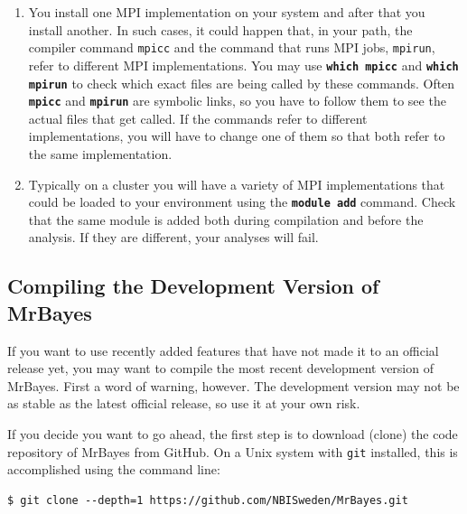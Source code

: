 \documentclass[12pt]{book}
\newcommand{\ttt}[1]{\texttt{#1}}
\newcommand{\tb}[1]{\ttt{\textbf{#1}}}
\begin{document}
\begin{enumerate}
\item You install one MPI implementation on your system and after that you install another. In
such cases, it could happen that, in your path, the compiler command \ttt{mpicc} and the command
that runs MPI jobs, \ttt{mpirun}, refer to different MPI implementations. You may use
\tb{which mpicc} and \tb{which mpirun} to check which exact files are being called by these
commands. Often \tb{mpicc} and \tb{mpirun} are symbolic links, so you have to follow them to see
the actual files that get called. If the commands refer to different implementations, you will
have to change one of them so that both refer to the same implementation.
\item Typically on a cluster you will have a variety of MPI implementations that could be loaded
to your environment using the \tb{module add} command. Check that the same module is added both
during compilation and before the analysis. If they are different, your analyses will fail.
\end{enumerate}

\subsection{Compiling the Development Version of MrBayes}
\label{compileDevVersion}
If you want to use recently added features that have not made it to an official release yet, you
may want to compile the most recent development version of MrBayes. First a word of warning,
however. The development version may not be as stable as the latest official release, so use it at
your own risk.

If you decide you want to go ahead, the first step is to download (clone) the code repository of
MrBayes from GitHub. On a Unix system with \ttt{git} installed, this is accomplished using the
command line:

\begin{verbatim}
$ git clone --depth=1 https://github.com/NBISweden/MrBayes.git
\end{verbatim}
\end{document}
